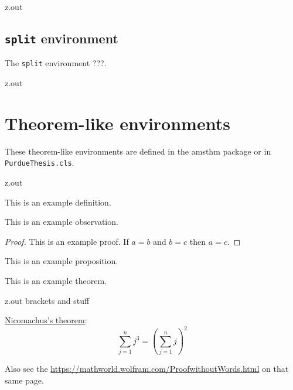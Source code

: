 \MyIOT


\begin{VerbatimOut}{z.out}

\subsection{\texttt{split} environment}

The \verb+split+ environment ???.
\end{VerbatimOut}

\MyIOT


\begin{VerbatimOut}{z.out}
\section{Theorem-like environments}

These theorem-like environments are defined
in the amsthm package or in \verb+PurdueThesis.cls+.
\end{VerbatimOut}

\MyIOT


\begin{VerbatimOut}{z.out}

\begin{definition}
  This is an example definition.
\end{definition}

\begin{observation}
  This is an example observation.
\end{observation}

\begin{proof}
  This is an example proof.
  If \(a = b\) and \(b = c\) then \(a = c\).
\end{proof}

\begin{proposition}
  This is an example proposition.
\end{proposition}

\begin{theorem}
  This is an example theorem.
\end{theorem}
\end{VerbatimOut}

\MyIOT


\begin{VerbatimOut}{z.out}
brackets and stuff

\href{https://en.wikipedia.org/wiki/Squared_triangular_number}{Nicomachus's theorem}:
\begin{equation}
  \sum_{j=1}^n j^3 = \left(\sum_{j=1}^n j\right)^2
\end{equation}

Also see the
\href{proof without words}{https://mathworld.wolfram.com/ProofwithoutWords.html}
on that same page.
\end{VerbatimOut}

